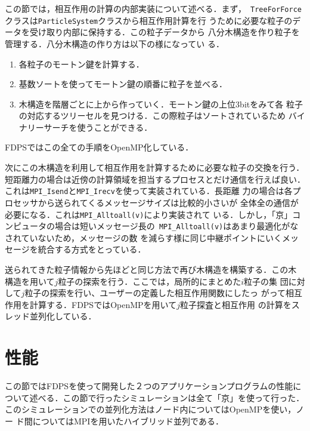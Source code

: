 \documentclass[submit,techreq,noauthor]{ipsj}
\begin{document}
この節では，相互作用の計算の内部実装について述べる．まず，{\tt
  TreeForForce}クラスは{\tt ParticleSystem}クラスから相互作用計算を行
うために必要な粒子のデータを受け取り内部に保持する．この粒子データから
八分木構造を作り粒子を管理する．八分木構造の作り方は以下の様になってい
る．

\begin{enumerate}
\item 各粒子のモートン鍵を計算する．
\item 基数ソートを使ってモートン鍵の順番に粒子を並べる．
\item 木構造を階層ごとに上から作っていく．モートン鍵の上位3bitをみて各
  粒子の対応するツリーセルを見つける．この際粒子はソートされているため
  バイナリーサーチを使うことができる．
\end{enumerate}

FDPSではこの全ての手順をOpenMP化している．

次にこの木構造を利用して相互作用を計算するために必要な粒子の交換を行う．
短距離力の場合は近傍の計算領域を担当するプロセスとだけ通信を行えば良い．
これは{\tt MPI\_Isend}と{\tt MPI\_Irecv}を使って実装されている．長距離
力の場合は各プロセッサから送られてくるメッセージサイズは比較的小さいが
全体全の通信が必要になる．これは{\tt MPI\_Alltoall(v)}により実装されて
いる．しかし，「京」コンピュータの場合は短いメッセージ長の{\tt
  MPI\_Alltoall(v)}はあまり最適化がなされていないため，メッセージの数
を減らす様に同じ中継ポイントにいくメッセージを統合する方式をとっている．

送られてきた粒子情報から先ほどと同じ方法で再び木構造を構築する．この木
構造を用いて$j$粒子の探索を行う．ここでは，局所的にまとめた$i$粒子の集
団に対して$j$粒子の探索を行い、ユーザーの定義した相互作用関数にしたっ
がって相互作用を計算する．FDPSではOpenMPを用いて$j$粒子探査と相互作用
の計算をスレッド並列化している．

\section{性能}


この節ではFDPSを使って開発した２つのアプリケーションプログラムの性能に
ついて述べる．この節で行ったシミュレーションは全て「京」を使って行った．
このシミュレーションでの並列化方法はノード内についてはOpenMPを使い，ノー
ド間についてはMPIを用いたハイブリッド並列である．
\end{document}
